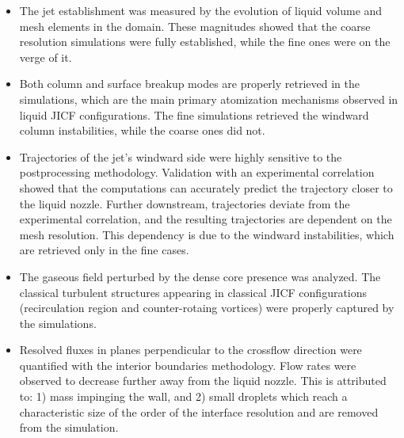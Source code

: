 \begin{itemize}

	\item The jet establishment was measured by the evolution of liquid volume and mesh elements in the domain. These magnitudes showed that the coarse resolution simulations were fully established, while the fine ones were on the verge of it.
	
	\vspace*{-0.05in}
	
	\item Both column and surface breakup modes are properly retrieved in the simulations, which are the main primary atomization mechanisms observed in liquid JICF configurations. The fine simulations retrieved the windward column instabilities, while the coarse ones did not. %
	
	
	\vspace*{-0.05in}
	
	\item Trajectories of the jet's windward side were highly sensitive to the postprocessing methodology. 
Validation with an experimental correlation showed that the computations can accurately predict the trajectory closer to the liquid nozzle. Further downstream, trajectories deviate from the experimental correlation, and the resulting trajectories are dependent on the mesh resolution. This dependency is due to the windward instabilities, which are retrieved only in the fine cases.

	\vspace*{-0.05in}

\item The gaseous field perturbed by the dense core presence was analyzed. The classical turbulent structures appearing in classical JICF configurations (recirculation region and counter-rotaing vortices) were properly captured by the simulations. %


	\vspace*{-0.05in}

 \item Resolved fluxes in planes perpendicular to the crossflow direction were quantified with the interior boundaries methodology. Flow rates were observed to decrease further away from the liquid nozzle. This is attributed to: 1) mass impinging the wall, and 2) small droplets which reach a characteristic size of the order of the interface resolution and are removed from the simulation.
 
 
\end{itemize}




